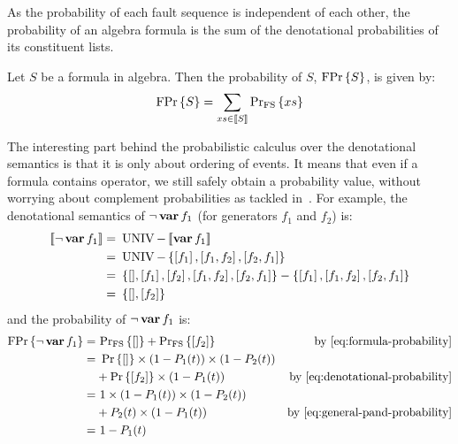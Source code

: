 As the probability of each fault sequence is independent of each other, the probability of an \ac{algebra} formula is the sum of the denotational probabilities of its constituent lists.

\begin{definition}
Let $S$ be a formula in \ac{algebra}.
Then the probability of $S$, $\mathrm{FPr}\left\{S\right\}$, is given by:
%
\begin{equation}
\label{eq:formula-probability}
\mathrm{FPr}\left\{S\right\} = \sum_{xs \in \left[\!\left[S\right]\!\right]}\mathrm{Pr_{FS}}\left\{xs\right\}
\end{equation}
\end{definition}

The interesting part behind the probabilistic calculus over the denotational semantics is that it is only about ordering of events.
It means that even if a formula contains  operator, we still safely obtain a probability value, without worrying about complement probabilities as tackled in~\cite{Andrews2001}.
For example, the denotational semantics of $\lnot \operatorname{\mathbf{var}} f_1$ (for generators $f_1$ and $f_2$) is:
%
\begin{align}
\left[\!\left[\lnot \operatorname{\mathbf{var}} f_1\right]\!\right] = &~ \operatorname{UNIV} - \left[\!\left[\operatorname{\mathbf{var}} f_1\right]\!\right] \nonumber\\
= &~ \operatorname{UNIV} - 
	\left\{
		\left[ f_1 \right],
		\left[ f_1,f_2 \right],
		\left[ f_2,f_1 \right]
	\right\}\nonumber\\
= &~ \left\{ 
		[],
		\left[ f_1 \right],
		\left[ f_2 \right],
		\left[ f_1,f_2 \right],
		\left[ f_2,f_1 \right]
	\right\} - 
	\left\{
	\left[ f_1 \right],
	\left[ f_1,f_2 \right],
	\left[ f_2,f_1 \right]
	\right\}
	\nonumber\\
= &~ \left\{[], \left[ f_2 \right] \right\}
\end{align}
%
and the probability of $\lnot \operatorname{\mathbf{var}} f_1$ is:
%
\begin{align}
\formulaprob{\lnot \var{f_1}} = &~ \denotationalprob{\left[\right]} + \denotationalprob{\left[f_2\right]} & \text{by \cref{eq:formula-probability}} \nonumber\\
= &~ \probability{\left[\right]}\times\left(1 - P_1(t)\right)\times\left(1 - P_2(t)\right)\nonumber\\
& + \probability{\left[f_2\right]}\times\left(1 - P_1(t)\right) & \text{by \cref{eq:denotational-probability}} \nonumber\\
= &~ 1 \times \left(1- P_1(t)\right) \times \left(1 - P_2(t)\right)\nonumber\\
& + P_2(t) \times \left(1 - P_1(t)\right) & \text{by \cref{eq:general-pand-probability}}\nonumber\\
= &~ 1 - P_1(t)
\end{align}

